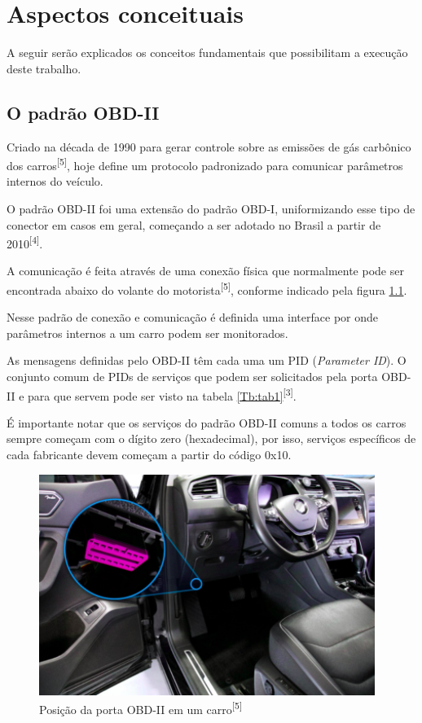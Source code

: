 \chapter{Aspectos conceituais}
\label{CAP2}

A seguir serão explicados os conceitos fundamentais que possibilitam a execução deste trabalho. 


\section{O padrão OBD-II}

Criado na década de 1990 para gerar controle sobre as emissões de gás carbônico dos carros\textsuperscript{[5]}, hoje define um protocolo padronizado para comunicar parâmetros internos do veículo.
    
O padrão OBD-II foi uma extensão do padrão OBD-I, uniformizando esse tipo de conector em casos em geral, começando a ser adotado no Brasil a partir de 2010\textsuperscript{[4]}.

A comunicação é feita através de uma conexão física que normalmente pode ser encontrada abaixo do volante do motorista\textsuperscript{[5]}, conforme indicado pela figura \ref{fig:obd2_conn}.

Nesse padrão de conexão e comunicação é definida uma interface por onde parâmetros internos a um carro podem ser monitorados.

As mensagens definidas pelo OBD-II têm cada uma um PID (\textit{Parameter ID}). O conjunto comum de PIDs de serviços que podem ser solicitados pela porta OBD-II e para que servem pode ser visto na tabela \ref{Tb:tab1}\textsuperscript{[3]}.



É importante notar que os serviços do padrão OBD-II comuns a todos os carros sempre começam com o dígito zero (hexadecimal), por isso, serviços específicos de cada fabricante devem começam a partir do código 0x10.

\begin{figure}[hp]
    \centering
    
    \includegraphics[]{figures/localizacao_obd2.png}
    
    \caption{Posição da porta OBD-II em um carro\textsuperscript{[5]}}
    
    \label{fig:obd2_conn}
\end{figure}

